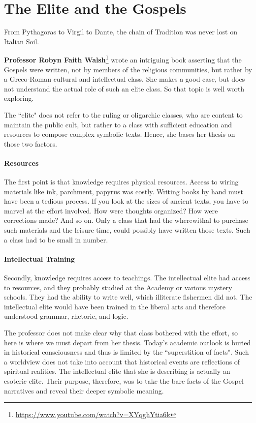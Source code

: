 \section{The Elite and the Gospels}

\begin{quotex}
From Pythagoras to Virgil to Dante, the chain of Tradition was never lost on Italian Soil. 

\end{quotex}
\textbf{Professor Robyn Faith Walsh}\footnote{\url{https://www.youtube.com/watch?v=XYqghYtia6k}} wrote an intriguing book asserting that the Gospels were written, not by members of the religious communities, but rather by a Greco-Roman cultural and intellectual class. She makes a good case, but does not understand the actual role of such an elite class. So that topic is well worth exploring.

The ``elite" does not refer to the ruling or oligarchic classes, who are content to maintain the public cult, but rather to a class with sufficient education and resources to compose complex symbolic texts. Hence, she bases her thesis on those two factors.

\paragraph{Resources}
The first point is that knowledge requires physical resources. Access to wiring materials like ink, parchment, papyrus was costly. Writing books by hand must have been a tedious process. If you look at the sizes of ancient texts, you have to marvel at the effort involved. How were thoughts organized? How were corrections made? And so on. Only a class that had the wherewithal to purchase such materials and the leisure time, could possibly have written those texts. Such a class had to be small in number.

\paragraph{Intellectual Training}
Secondly, knowledge requires access to teachings. The intellectual elite had access to resources, and they probably studied at the Academy or various mystery schools. They had the ability to write well, which illiterate fishermen did not. The intellectual elite would have been trained in the liberal arts and therefore understood grammar, rhetoric, and logic.

The professor does not make clear why that class bothered with the effort, so here is where we must depart from her thesis. Today's academic outlook is buried in historical consciousness and thus is limited by the ``superstition of facts". Such a worldview does not take into account that historical events are reflections of spiritual realities. The intellectual elite that she is describing is actually an esoteric elite. Their purpose, therefore, was to take the bare facts of the Gospel narratives and reveal their deeper symbolic meaning.

